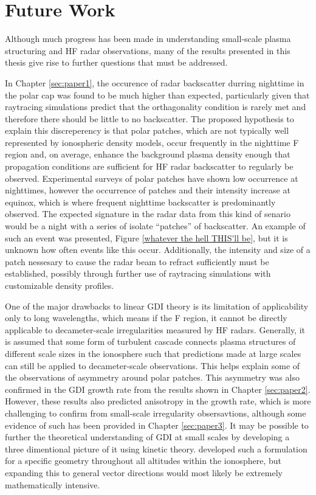 \section{Future Work}
\label{sec:futurework}

Although much progress has been made in understanding small-scale plasma structuring and HF radar observations, many of the results presented in this thesis give rise to further questions that must be addressed.

In Chapter \ref{sec:paper1}, the occurence of radar backscatter durring nighttime in the polar cap was found to be much higher than expected, particularly given that raytracing simulations predict that the orthagonality condition is rarely met and therefore there should be little to no backscatter.  The proposed hypothesis to explain this discreperency is that polar patches, which are not typically well represented by ionospheric density models, occur frequently in the nighttime F region and, on average, enhance the background plasma density enough that propagation conditions are sufficient for HF radar backscatter to regularly be observed.  Experimental surveys of polar patches have shown low occurrence at nighttimes, however the occurrence of patches and their intensity increase at equinox, which is where frequent nighttime backscatter is predominantly observed.  The expected signature in the radar data from this kind of senario would be a night with a series of isolate ``patches'' of backscatter.  An example of such an event was presented, Figure \ref{whatever the hell THIS'll be}, but it is unknown how often events like this occur.  Additionally, the intensity and size of a patch nessesary to cause the radar beam to refract sufficiently must be established, possibly through further use of raytracing simulations with customizable density profiles.

One of the major drawbacks to linear GDI theory is its limitation of applicability only to long wavelengths, which means if the F region, it cannot be directly applicable to decameter-scale irregularities measured by HF radars.  Generally, it is assumed that some form of turbulent cascade connects plasma structures of different scale sizes in the ionosphere such that predictions made at large scales can still be applied to decameter-scale observations.  This helps explain some of the observations of asymmetry around polar patches.  This asymmetry was also confirmed in the GDI growth rate from the results shown in Chapter \ref{sec:paper2}.  However, these results also predicted anisotropy in the growth rate, which is more challenging to confirm from small-scale irregularity obsersavtions, although some evidence of such has been provided in Chapter \ref{sec:paper3}.  It may be possible to further the theoretical understanding of GDI at small scales by developing a three dimentional picture of it using kinetic theory.  \citet{Basu1995} developed such a formulation for a specific geometry throughout all altitudes within the ionosphere, but expanding this to general vector directions would most likely be extremely mathematically intensive.

